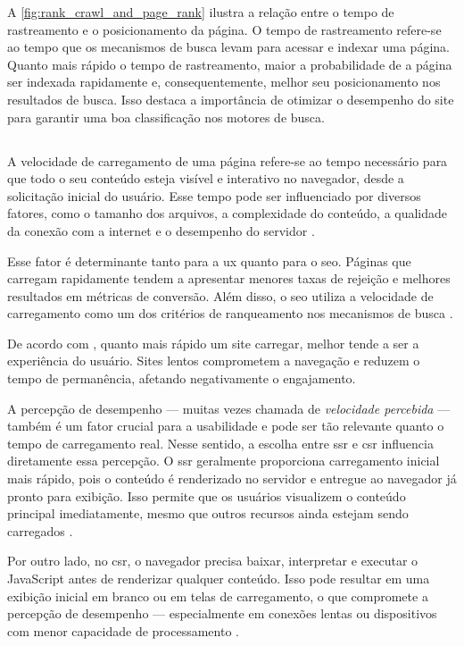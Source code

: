 A \autoref{fig:rank_crawl_and_page_rank} ilustra a relação entre o tempo de rastreamento e o posicionamento da página. O tempo de rastreamento refere-se ao tempo que os mecanismos de busca levam para acessar e indexar uma página. Quanto mais rápido o tempo de rastreamento, maior a probabilidade de a página ser indexada rapidamente e, consequentemente, melhor seu posicionamento nos resultados de busca. Isso destaca a importância de otimizar o desempenho do site para garantir uma boa classificação nos motores de busca.

\subsection{}
\label{sec:velocidade da página}

A velocidade de carregamento de uma página refere-se ao tempo necessário para que todo o seu conteúdo esteja visível e interativo no navegador, desde a solicitação inicial do usuário. Esse tempo pode ser influenciado por diversos fatores, como o tamanho dos arquivos, a complexidade do conteúdo, a qualidade da conexão com a internet e o desempenho do servidor \cite{shopify2024}.

Esse fator é determinante tanto para a \acrshort{ux} quanto para o \acrshort{seo}. Páginas que carregam rapidamente tendem a apresentar menores taxas de rejeição e melhores resultados em métricas de conversão. Além disso, o \acrshort{seo} utiliza a velocidade de carregamento como um dos critérios de ranqueamento nos mecanismos de busca \cite{conor2022}.

De acordo com , quanto mais rápido um site carregar, melhor tende a ser a experiência do usuário. Sites lentos comprometem a navegação e reduzem o tempo de permanência, afetando negativamente o engajamento.

A percepção de desempenho — muitas vezes chamada de \emph{velocidade percebida} — também é um fator crucial para a usabilidade e pode ser tão relevante quanto o tempo de carregamento real. Nesse sentido, a escolha entre \acrshort{ssr} e \acrshort{csr} influencia diretamente essa percepção. O \acrshort{ssr} geralmente proporciona carregamento inicial mais rápido, pois o conteúdo é renderizado no servidor e entregue ao navegador já pronto para exibição. Isso permite que os usuários visualizem o conteúdo principal imediatamente, mesmo que outros recursos ainda estejam sendo carregados \cite{atori2024}.

Por outro lado, no \acrshort{csr}, o navegador precisa baixar, interpretar e executar o JavaScript antes de renderizar qualquer conteúdo. Isso pode resultar em uma exibição inicial em branco ou em telas de carregamento, o que compromete a percepção de desempenho — especialmente em conexões lentas ou dispositivos com menor capacidade de processamento \cite{pixelfree2023}.


